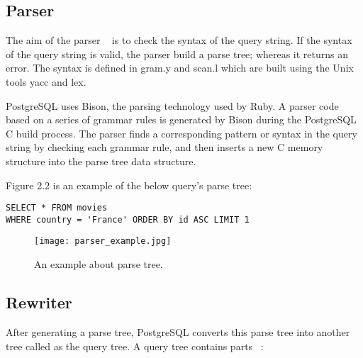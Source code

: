 \subsection{Parser}

The aim of the parser ~\cite{flow_of_a_select_statement} is to check the syntax of
the query string. If the syntax of the query string is valid, the parser build a parse
tree; whereas it returns an error. The syntax is defined in gram.y and scan.l which are built using the Unix tools yacc and lex. 

PostgreSQL uses Bison, the parsing technology used by Ruby. A parser code based on 
a series of grammar rules is generated by Bison during the PostgreSQL C build process.
The parser finds a corresponding pattern or syntax in the query string by checking each
grammar rule, and then inserts a new C memory structure into the parse tree data structure.

Figure 2.2 is an example of the below query's parse tree:
\begin{verbatim}
SELECT * FROM movies
WHERE country = 'France' ORDER BY id ASC LIMIT 1
\end{verbatim}

\begin{figure}[H]
    \centering
    \texttt{[image: parser\_example.jpg]}
    \caption{An example about parse tree.}
\end{figure}

\subsection{Rewriter}

After generating a parse tree, PostgreSQL converts this parse tree into another tree called as the query tree. A query tree contains parts ~\cite{pg_internals}:

